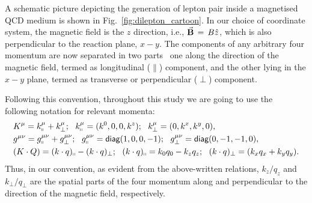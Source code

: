 \documentclass[aps,prd,floatfix,showpacs,showkeys,superscriptadress,unsortedaddress,nofootinbib,onecolumn]{revtex4-1}
\newcommand{\sperp}{\scriptscriptstyle{\perp}}
\begin{document}
A schematic picture depicting the generation of lepton pair inside a magnetised QCD medium is shown in Fig.~\ref{fig:dilepton_cartoon}. In our choice of coordinate system, the magnetic field is the $z$ direction, i.e., $\vec {\bf B}\,=\, B \hat{z}$, which is also perpendicular to the reaction plane, $x-y$. The components of any arbitrary four momentum are now separated in two parts \textemdash\, one along the direction of the magnetic field, termed as longitudinal ($\parallel$) component, and the other lying in the $x-y$ plane, termed as transverse or perpendicular ($\perp$) component.

Following this convention, throughout this study we are going to use the following notation for relevant momenta:
\begin{subequations}
\begin{align}
& K^\mu = k_\shortparallel^\mu + k_\perp^\mu;~~ k_\shortparallel^\mu = (k^0,0,0,k^z) ;~~  k_\perp^\mu = (0,k^x,k^y,0),\\
&g^{\mu\nu} = g_\shortparallel^{\mu\nu} + g_\perp^{\mu\nu};~~ g_\shortparallel^{\mu\nu}= \textsf{diag}(1,0,0,-1);~~ g_\perp^{\mu\nu} = \textsf{diag}(0,-1,-1,0),\\
&(K \cdot Q) = (k\cdot q)_\shortparallel - (k\cdot q)_\perp;~~ (k\cdot q)_\shortparallel = k_0q_0-k_zq_z;~~ (k\cdot q)_\perp = (k_xq_x+k_yq_y).
\end{align}
\label{eq:mom_decom}
\end{subequations}
Thus, in our convention, as evident from the above-written relations, $k_z/q_z$ and $k_{\sperp}/q_{\sperp}$ are the spatial parts of the four momentum along and perpendicular to the direction of the magnetic field, respectively. 
\end{document}
